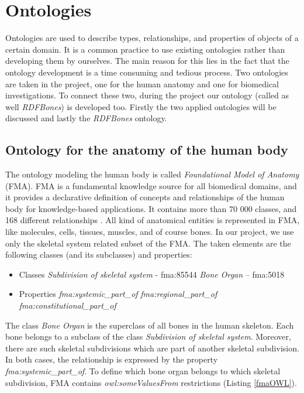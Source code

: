 \section{Ontologies} \label{22}

Ontologies are used to describe types, relationships, and properties of objects of a certain domain. It is a common practice to use existing ontologies rather than developing them by ourselves. The main reason for this lies in the fact that the ontology development is a time consuming and tedious process. Two ontologies are taken in the project, one for the human anatomy and one for biomedical investigations. To connect these two, during the project our ontology (called as well \textit{RDFBones}) is developed too. Firstly the two applied ontologies will be discussed and lastly the \textit{RDFBones} ontology.

\subsection{Ontology for the anatomy of the human body}  \label{fma}

The ontology modeling the human body is called \textit{Foundational Model of Anatomy} (FMA). FMA is a fundamental knowledge source for all biomedical domains, and it provides a declarative definition of concepts and relationships of the human body for knowledge-based applications. It contains more than 70 000 classes, and 168 different relationships \cite{Rosse2003478}. All kind of anatomical entities is represented in FMA, like molecules, cells, tissues, muscles, and of course bones. In our project, we use only the skeletal system related subset of the FMA. The taken elements are the following classes (and its subclasses) and properties: 

\begin{itemize}
	\item{Classes}
		\subitem \textit{Subdivision of skeletal system} - fma:85544 
		\subitem \textit{Bone Organ} – fma:5018
\end{itemize}

\begin{itemize}
	\item{Properties}
		\subitem \textit{fma:systemic\_part\_of}
		\subitem \textit{fma:regional\_part\_of}
		\subitem \textit{fma:constitutional\_part\_of}
\end{itemize}

The class \textit{Bone Organ} is the superclass of all bones in the human skeleton. Each bone belongs to a subclass of the class \textit{Subdivision of skeletal system}. Moreover, there are such skeletal subdivisions which are part of another skeletal subdivision. In both cases, the relationship is expressed by the property \textit{fma:systemic\_part\_of}. To define which bone organ belongs to which skeletal subdivision, FMA contains \textit{owl:someValuesFrom} restrictions (Listing \ref{fmaOWL}).

